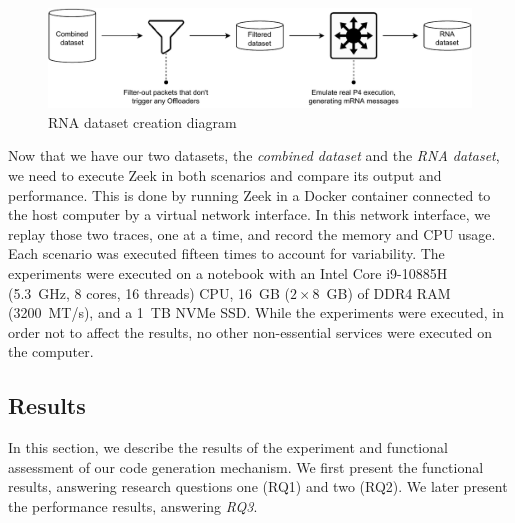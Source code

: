 \begin{figure}[htb]
    \caption{RNA dataset creation diagram}
    \begin{center}
        \includegraphics[width=1.0\textwidth]{images/rna_dataset_creation.pdf}  
    \end{center}
    \label{fig:rna_dataset_diagram}
\end{figure}

Now that we have our two datasets, the \textit{combined dataset} and the \textit{RNA dataset}, we need to execute Zeek in both scenarios and compare its output and performance. This is done by running Zeek in a Docker container connected to the host computer by a virtual network interface. In this network interface, we replay those two traces, one at a time, and record the memory and CPU usage. Each scenario was executed fifteen times to account for variability. The experiments were executed on a notebook with an Intel Core i9-10885H (\SI{5.3}{GHz}, 8 cores, 16 threads) CPU, \SI{16}{GB} ($2 \times$\SI{8}{GB}) of DDR4 RAM (\SI{3200}{MT/s}), and a \SI{1}{TB} NVMe SSD. While the experiments were executed, in order not to affect the results, no other non-essential services were executed on the computer.





\subsection{Results}

In this section, we describe the results of the experiment and functional assessment of our code generation mechanism. We first present the functional results, answering research questions one (RQ1) and two (RQ2). We later present the performance results, answering \textit{RQ3}.

